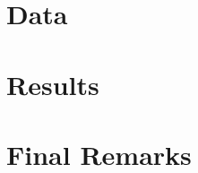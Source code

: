 \documentclass[
	12pt, 
	]{article}
\begin{document}
\newpage


\section{Data}




\section{Results}




\section{Final Remarks}



\newpage



{	
	\onehalfspacing
	\printbibliography[heading=bibintoc]
}

\newpage



\appendix


\end{document}
